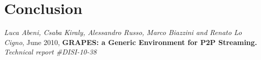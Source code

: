 \documentclass[12pt,a4paper]{report}
\begin{document}
\chapter{Conclusion}



\begin{appendices}



\end{appendices}


\begin{thebibliography}{99}

 \textit{Luca Abeni, Csaba Kiraly, Alessandro Russo,
Marco Biazzini and Renato Lo Cigno},
June 2010, \textbf{GRAPES: a Generic Environment for P2P Streaming.}
{\em Technical report \#DISI-10-38}

\end{thebibliography}

\tableofcontents
\listoffigures
\listoftables

%
\end{document}
